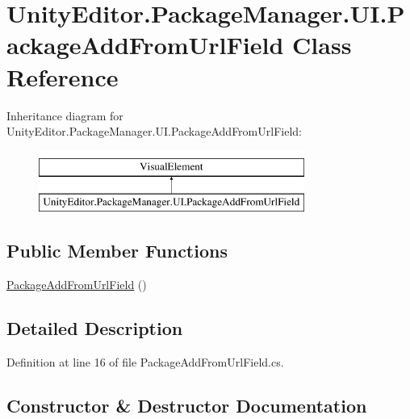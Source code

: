 \hypertarget{class_unity_editor_1_1_package_manager_1_1_u_i_1_1_package_add_from_url_field}{}\section{Unity\+Editor.\+Package\+Manager.\+U\+I.\+Package\+Add\+From\+Url\+Field Class Reference}
\label{class_unity_editor_1_1_package_manager_1_1_u_i_1_1_package_add_from_url_field}
Inheritance diagram for Unity\+Editor.\+Package\+Manager.\+U\+I.\+Package\+Add\+From\+Url\+Field\+:\begin{figure}[H]
\begin{center}
\leavevmode
\includegraphics[height=2.000000cm]{class_unity_editor_1_1_package_manager_1_1_u_i_1_1_package_add_from_url_field}
\end{center}
\end{figure}
\subsection*{Public Member Functions}
\begin{DoxyCompactItemize}
\item 
\mbox{\hyperlink{class_unity_editor_1_1_package_manager_1_1_u_i_1_1_package_add_from_url_field_a44312c355acb51bdf22bb913fe6bb5b4}{Package\+Add\+From\+Url\+Field}} ()
\end{DoxyCompactItemize}


\subsection{Detailed Description}


Definition at line 16 of file Package\+Add\+From\+Url\+Field.\+cs.



\subsection{Constructor \& Destructor Documentation}
\mbox{\label{class_unity_editor_1_1_package_manager_1_1_u_i_1_1_package_add_from_url_field_a44312c355acb51bdf22bb913fe6bb5b4}} 
